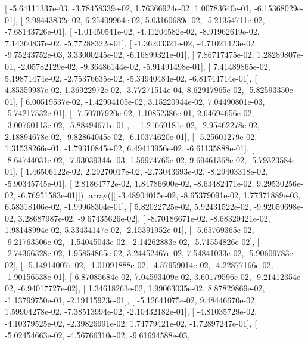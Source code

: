 \documentclass{article}
\begin{document}
       [ -5.64111337e-03,  -3.78458339e-02,   1.76366924e-02,
          1.00783640e-01,  -6.15368029e-01],
       [  2.98443832e-02,   6.25409964e-02,   5.03160689e-02,
         -5.21354711e-02,  -7.68143726e-01],
       [ -1.01450541e-02,  -4.41204582e-02,  -8.91962619e-02,
          7.14360837e-02,  -5.77288322e-01],
       [ -1.36203321e-02,  -4.71021423e-02,  -9.75243752e-03,
          3.33000245e-02,  -6.16899321e-01],
       [  7.86717475e-02,   1.28289807e-01,  -2.05782129e-02,
         -9.36486144e-02,  -5.91491498e-01],
       [  7.41489865e-02,   5.19871474e-02,  -2.75376635e-02,
         -5.34940484e-02,  -6.81744714e-01],
       [  4.85359987e-02,   1.36922972e-02,  -3.77271514e-04,
          8.62917965e-02,  -5.82593350e-01],
       [  6.00519537e-02,  -1.42904105e-02,   3.15220944e-02,
          7.04490801e-03,  -5.74217532e-01],
       [ -7.50707920e-02,   1.10852386e-01,   2.64694656e-02,
         -3.00760113e-02,  -5.88494671e-01],
       [ -1.21669181e-02,  -2.95462278e-02,   2.18894678e-02,
         -9.82864045e-02,  -6.10374620e-01],
       [ -5.25601279e-02,   1.31538266e-01,  -1.79310845e-02,
          6.49413956e-02,  -6.61135888e-01],
       [ -8.64744031e-02,  -7.93039344e-03,   1.59974765e-02,
          9.69461368e-02,  -5.79323584e-01],
       [  1.46506122e-02,   2.29270017e-02,  -2.73043693e-02,
         -8.29403318e-02,  -5.90345745e-01],
       [  2.81864772e-02,   1.84786600e-02,  -8.63482471e-02,
          9.29530256e-02,  -6.76951583e-01]]), array([[ -3.48904015e-02,  -8.65379091e-02,   1.77371889e-03,
          6.58318106e-02,  -1.99968304e-01],
       [  5.82022725e-02,   5.92431522e-02,  -9.92059698e-02,
          3.28687987e-02,  -9.67435626e-02],
       [ -8.70186671e-02,  -8.68320421e-02,   1.98148994e-02,
          5.33434147e-02,  -2.15391952e-01],
       [ -5.65769365e-02,  -9.21763506e-02,  -1.54045043e-02,
         -2.14262883e-02,  -5.71554826e-02],
       [ -2.74366328e-02,   1.95854865e-02,   3.24452467e-02,
          7.54841033e-02,  -5.90609783e-02],
       [ -5.14914007e-02,  -1.01091888e-02,  -4.57959014e-02,
         -4.22877166e-02,  -1.90156538e-01],
       [  6.87085684e-02,   7.04593409e-02,   3.60179596e-02,
         -9.21412354e-02,  -6.94017727e-02],
       [  1.34618263e-02,   1.99063035e-02,   8.87829869e-02,
         -1.13799750e-01,  -2.19115923e-01],
       [ -5.12641075e-02,   9.48446670e-02,   1.59904278e-02,
         -7.38513994e-02,  -2.10432182e-01],
       [ -4.81035729e-02,  -4.10379525e-02,  -2.39826991e-02,
          1.74779421e-02,  -1.72897247e-01],
       [ -5.02454663e-02,  -4.56766310e-02,  -9.61694588e-03,
\end{document}
